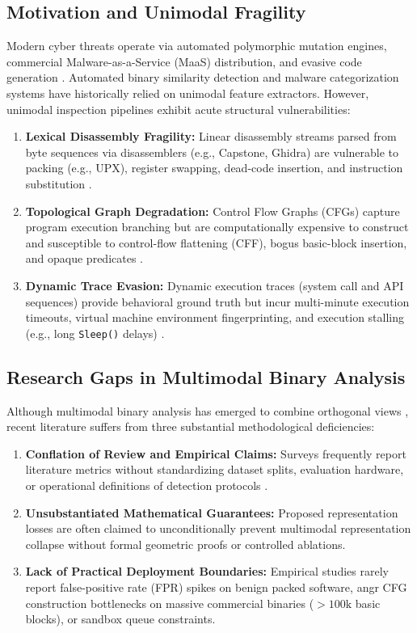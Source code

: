 \documentclass[pdflatex,sn-mathphys-num]{sn-jnl}
\begin{document}
\subsection{Motivation and Unimodal Fragility}\label{sec:intro_motivation}
Modern cyber threats operate via automated polymorphic mutation engines, commercial Malware-as-a-Service (MaaS) distribution, and evasive code generation \cite{Gibert2020,Ni2018,Kim2023Revisiting,BinCola2024}. Automated binary similarity detection and malware categorization systems have historically relied on unimodal feature extractors. However, unimodal inspection pipelines exhibit acute structural vulnerabilities:
\begin{enumerate}
    \item \textbf{Lexical Disassembly Fragility:} Linear disassembly streams parsed from byte sequences via disassemblers (e.g., Capstone, Ghidra) are vulnerable to packing (e.g., UPX), register swapping, dead-code insertion, and instruction substitution \cite{Borello2014,Kim2023Revisiting,Tay2022Transformers}.
    \item \textbf{Topological Graph Degradation:} Control Flow Graphs (CFGs) capture program execution branching but are computationally expensive to construct and susceptible to control-flow flattening (CFF), bogus basic-block insertion, and opaque predicates \cite{Qiang2022,SHIELD2026,FewMHGCL2023}.
    \item \textbf{Dynamic Trace Evasion:} Dynamic execution traces (system call and API sequences) provide behavioral ground truth but incur multi-minute execution timeouts, virtual machine environment fingerprinting, and execution stalling (e.g., long \texttt{Sleep()} delays) \cite{Landman2021DeepHook,MalInsight2019,Alzaylaee2020}.
\end{enumerate}

\subsection{Research Gaps in Multimodal Binary Analysis}\label{sec:intro_gaps}
Although multimodal binary analysis has emerged to combine orthogonal views \cite{FewMHGCL2023,BinCola2024,Baltrusaitis2019,LeKhac2020}, recent literature suffers from three substantial methodological deficiencies:
\begin{enumerate}
    \item \textbf{Conflation of Review and Empirical Claims:} Surveys frequently report literature metrics without standardizing dataset splits, evaluation hardware, or operational definitions of detection protocols \cite{Shaukat2020,Liu2022Android}.
    \item \textbf{Unsubstantiated Mathematical Guarantees:} Proposed representation losses are often claimed to unconditionally prevent multimodal representation collapse without formal geometric proofs or controlled ablations.
    \item \textbf{Lack of Practical Deployment Boundaries:} Empirical studies rarely report false-positive rate (FPR) spikes on benign packed software, angr CFG construction bottlenecks on massive commercial binaries ($>100\text{k}$ basic blocks), or sandbox queue constraints.
\end{enumerate}
\end{document}
